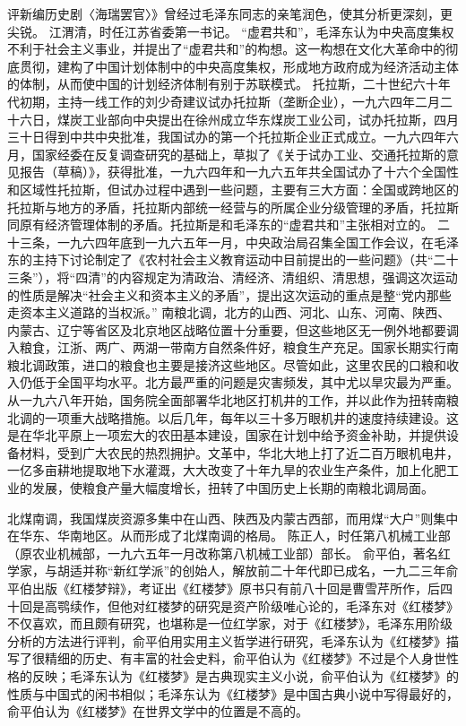 \begin{maonote}
评新编历史剧〈海瑞罢官〉》曾经过毛泽东同志的亲笔润色，使其分析更深刻，更尖锐。
江渭清，时任江苏省委第一书记。
“虚君共和”，毛泽东认为中央高度集权不利于社会主义事业，并提出了“虚君共和”的构想。这一构想在文化大革命中的彻底贯彻，建构了中国计划体制中的中央高度集权，形成地方政府成为经济活动主体的体制，从而使中国的计划经济体制有别于苏联模式。
托拉斯，二十世纪六十年代初期，主持一线工作的刘少奇建议试办托拉斯（垄断企业），一九六四年二月二十六日，煤炭工业部向中央提出在徐州成立华东煤炭工业公司，试办托拉斯，四月三十日得到中共中央批准，我国试办的第一个托拉斯企业正式成立。一九六四年六月，国家经委在反复调查研究的基础上，草拟了《关于试办工业、交通托拉斯的意见报告（草稿）》，获得批准，一九六四年和一九六五年共全国试办了十六个全国性和区域性托拉斯，但试办过程中遇到一些问题，主要有三大方面：全国或跨地区的托拉斯与地方的矛盾，托拉斯内部统一经营与的所属企业分级管理的矛盾，托拉斯同原有经济管理体制的矛盾。托拉斯是和毛泽东的“虚君共和”主张相对立的。
二十三条，一九六四年底到一九六五年一月，中央政治局召集全国工作会议，在毛泽东的主持下讨论制定了《农村社会主义教育运动中目前提出的一些问题》（共“二十三条”），将“四清”的内容规定为清政治、清经济、清组织、清思想，强调这次运动的性质是解决“社会主义和资本主义的矛盾”，提出这次运动的重点是整“党内那些走资本主义道路的当权派。”
南粮北调，北方的山西、河北、山东、河南、陕西、内蒙古、辽宁等省区及北京地区战略位置十分重要，但这些地区无一例外地都要调入粮食，江浙、两广、两湖一带南方自然条件好，粮食生产充足。国家长期实行南粮北调政策，进口的粮食也主要是接济这些地区。尽管如此，这里农民的口粮和收入仍低于全国平均水平。北方最严重的问题是灾害频发，其中尤以旱灾最为严重。从一九六八年开始，国务院全面部署华北地区打机井的工作，并以此作为扭转南粮北调的一项重大战略措施。以后几年，每年以三十多万眼机井的速度持续建设。这是在华北平原上一项宏大的农田基本建设，国家在计划中给予资金补助，并提供设备材料，受到广大农民的热烈拥护。文革中，华北大地上打了近二百万眼机电井，一亿多亩耕地提取地下水灌溉，大大改变了十年九旱的农业生产条件，加上化肥工业的发展，使粮食产量大幅度增长，扭转了中国历史上长期的南粮北调局面。

北煤南调，我国煤炭资源多集中在山西、陕西及内蒙古西部，而用煤“大户”则集中在华东、华南地区。从而形成了北煤南调的格局。
陈正人，时任第八机械工业部（原农业机械部，一九六五年一月改称第八机械工业部）部长。
俞平伯，著名红学家，与胡适并称“新红学派”的创始人，解放前二十年代即已成名，一九二三年俞平伯出版《红楼梦辩》，考证出《红楼梦》原书只有前八十回是曹雪芹所作，后四十回是高鹗续作，但他对红楼梦的研究是资产阶级唯心论的，毛泽东对《红楼梦》不仅喜欢，而且颇有研究，也堪称是一位红学家，对于《红楼梦》，毛泽东用阶级分析的方法进行评判，俞平伯用实用主义哲学进行研究，毛泽东认为《红楼梦》描写了很精细的历史、有丰富的社会史料，俞平伯认为《红楼梦》不过是个人身世性格的反映；毛泽东认为《红楼梦》是古典现实主义小说，俞平伯认为《红楼梦》的性质与中国式的闲书相似；毛泽东认为《红楼梦》是中国古典小说中写得最好的，俞平伯认为《红楼梦》在世界文学中的位置是不高的。
\end{maonote}
